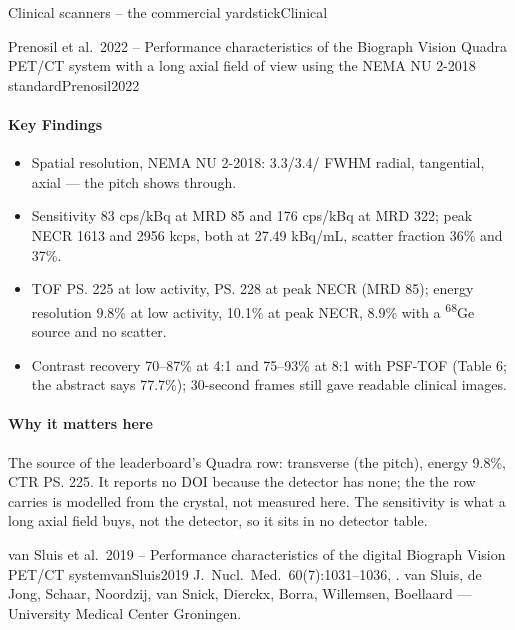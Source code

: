 \begin{programnote}{Clinical scanners -- the commercial yardstick}{Clinical}
\begin{papernote}{Prenosil et al.\ 2022 -- Performance characteristics of the Biograph Vision Quadra PET/CT system with a long axial field of view using the NEMA NU 2-2018 standard}{Prenosil2022}
\paragraph{Key Findings}
\begin{itemize}
	\item Spatial resolution, NEMA NU 2-2018: 3.3/3.4/ FWHM radial,
		tangential, axial --- the pitch shows through.
	\item Sensitivity 83 cps/kBq at MRD 85 and 176 cps/kBq at MRD 322;
		peak NECR 1613 and 2956 kcps, both at 27.49 kBq/mL, scatter fraction
		36\% and 37\%.
	\item TOF \ps{225} at low activity, \ps{228} at peak NECR (MRD 85);
		energy resolution 9.8\% at low activity, 10.1\% at peak NECR, 8.9\%
		with a \textsuperscript{68}Ge source and no scatter.
	\item Contrast recovery 70--87\% at 4:1 and 75--93\% at 8:1 with PSF-TOF (Table 6; the abstract says 77.7\%);
		30-second frames still gave readable clinical images.
\end{itemize}

\paragraph{Why it matters here}
The source of the leaderboard's Quadra row: transverse  (the pitch),
energy 9.8\%, CTR \ps{225}. It reports no DOI because the detector has none;
the  the row carries is modelled from the crystal, not measured
here. The sensitivity is what a long axial field buys, not the detector, so
it sits in no detector table.
\end{papernote}

\begin{papernote}{van Sluis et al.\ 2019 -- Performance characteristics of the digital Biograph Vision PET/CT system}{vanSluis2019}
J.\ Nucl.\ Med.\ 60(7):1031--1036, . van Sluis,
de Jong, Schaar, Noordzij, van Snick, Dierckx, Borra, Willemsen, Boellaard ---
University Medical Center Groningen.


\end{papernote}
\end{programnote}
